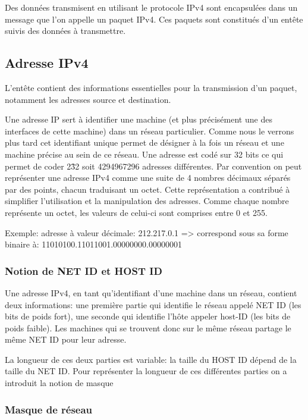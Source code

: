 Des données transmisent en utilisant le protocole IPv4 sont encapsulées dans un message que
l'on appelle un paquet IPv4. Ces paquets sont constitués d'un entête suivis des données à transmettre.

\subsection{Adresse IPv4}

L'entête contient des informations essentielles pour la transmission d'un paquet, notamment les
adresses source et destination.

Une adresse IP sert à identifier une machine (et plus précisément une des interfaces de cette machine)
dans un réseau particulier.
Comme nous le verrons plus tard cet identifiant unique permet de désigner à la fois un
réseau et une machine précise au sein de ce réseau.
Une adresse est codé sur 32 bits ce qui permet de coder 2\^32 soit 4294967296 adresses différentes.
Par convention on peut représenter une adresse IPv4 comme une suite de 4 nombres décimaux séparés par des points,
chacun traduisant un octet. Cette représentation a contribué à simplifier l'utilisation et la manipulation
des adresses.
Comme chaque nombre représente un octet, les valeurs de celui-ci sont comprises entre 0 et 255.

\vspace{1cm}
Exemple: adresse à valeur décimale: 212.217.0.1 => correspond sous sa forme
binaire à: 11010100.11011001.00000000.00000001
\vspace{1cm}

\subsubsection{Notion de NET ID et HOST ID}
Une adresse IPv4, en tant qu'identifiant d'une machine dans un réseau, contient deux informations:
une première partie qui identifie le réseau appelé NET ID (les bits de poids fort), une seconde qui identifie l’hôte appeler host-ID (les bits de poids faible).
Les machines qui se trouvent donc sur le même réseau partage le même NET ID pour leur adresse.

La longueur de ces deux parties est variable: la taille du HOST ID dépend de la taille du NET ID. Pour représenter la longueur de ces différentes parties on a introduit la notion de masque

\subsubsection{Masque de réseau}

